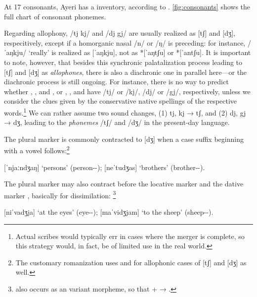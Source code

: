 At 17 consonants, Ayeri has a  inventory, according 
to \citet{wals1}. \autoref{fig:consonants} shows the full chart of consonant 
phonemes.

Regarding allophony, /tj kj/ and /dj gj/ are usually realized as [tʃ] and [dʒ], 
respecitively, except if a homorganic nasal /n/ or /ŋ/ is preceding: for 
instance,  /ˈaŋkju/ `really' is realized as [ˈaŋkju], not as 
*[ˈaŋtʃu] or *[ˈantʃu]. It is important to note, however, that besides this 
synchronic palatalization process leading to [tʃ] and [dʒ] as \emph{allophones}, 
there is also a diachronic one in parallel here---or the diachronic process is 
still ongoing. For instance, there is no way to predict whether 
, , 
and , or , 
, and  have /tj/ or /kj/, /dj/ 
or /gj/, respectively, unless we consider the clues given by the conservative 
native spellings of the respective words.\footnote{Actual scribes would 
typically err in cases where the merger is complete, so this strategy would, in 
fact, be of limited use in the real world.} We can rather assume two sound 
changes, (1) tj, kj → tʃ, and (2) dj, gj → dʒ, leading to the \emph{phonemes} 
/tʃ/ and /dʒ/ in the present-day language.

The plural marker  is commonly contracted to [dʒ] when a case 
suffix beginning with a vowel follows:\footnote{The customary romanization uses 
 and  for allophonic cases of [tʃ] and [dʒ] as well.}

\pex
	\a {} [ˈnjaːndʒaŋ] `persons' (person-\Pl{}-\Aarg{});
	\a {} [neˈtudʒas] `brothers' (brother-\Pl{}-\Parg{}).
\xe

The plural marker may also contract before the locative marker 
and the dative marker , basically for dissimilation:%
\footnote{ also occurs as an variant morpheme, so that 
 +  → .}

\pex
	\a {} [niˈvadʒja] `at the eyes' (eye-\Pl{}-\Loc{});
	\a {} [maˈvidʒjam] `to the sheep' (sheep-\Pl{}-\Dat{}).
\xe

